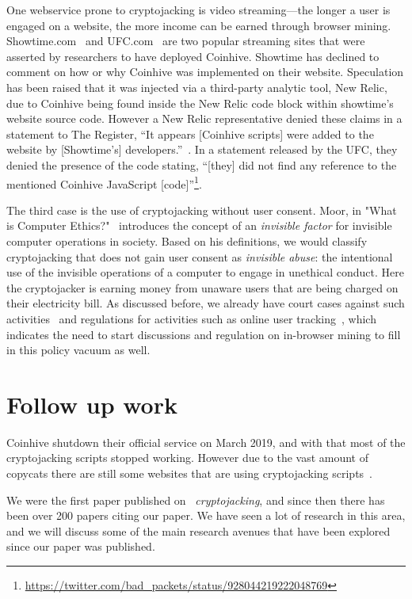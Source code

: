 One webservice prone to cryptojacking is video streaming---the longer a user is engaged on a website, the more income can be earned through browser mining. Showtime.com~\cite{registershowtime} and UFC.com~\cite{registerufcmonero} are two popular streaming sites that were asserted by researchers to have deployed Coinhive. Showtime has declined to comment on how or why Coinhive was implemented on their website. Speculation has been raised that it was injected via a third-party analytic tool, New Relic, due to Coinhive being found inside the New Relic code block within showtime's website source code. However a New Relic representative denied these claims in a statement to The Register, ``It appears [Coinhive scripts] were added to the website by [Showtime's] developers.''~\cite{registershowtime}. In a statement released by the UFC, they denied the presence of the code stating, ``[they] did not find any reference to the mentioned Coinhive JavaScript [code]''\footnote{\url{https://twitter.com/bad_packets/status/928044219222048769}}.

The third case is the use of cryptojacking without user consent. Moor, in "What is Computer Ethics?"~\cite{moor1985computer} introduces the concept of an \textit{invisible factor} for invisible computer operations in society. Based on his definitions, we would classify cryptojacking that does not gain user consent as \textit{invisible abuse}: the intentional use of the invisible operations of a computer to engage in unethical conduct. Here the cryptojacker is earning money from unaware users that are being charged on their electricity bill. As discussed before, we already have court cases against such activities~\cite{njcourtbitcoinjsminer} and regulations for activities such as online user tracking~\cite{eucookie}, which indicates the need to start discussions and regulation on in-browser mining to fill in this policy vacuum as well. 




\section{Follow up work}\label{sec:cryptojackingfollowup}
Coinhive shutdown their official service on March 2019, and with that most of the cryptojacking scripts stopped working. However due to the vast amount of copycats there are still some websites that are using cryptojacking scripts~\cite{varlioglu2020cryptojacking}. 

We were the first paper published on ~\textit{cryptojacking}, and since then there has been over 200 papers citing our paper. We have seen a lot of research in this area, and we will discuss some of the main research avenues that have been explored since our paper was published.

